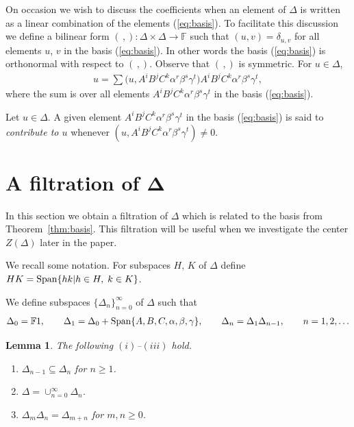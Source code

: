 \documentclass[pdftex]{sigma}
\numberwithin{equation}{section}
\newtheorem{Lemma}[Theorem]{Lemma}
\begin{document}
 On occasion we
wish to discuss the coef\/f\/icients
when an element of $\Delta$ is written as a linear
combination of the elements
(\ref{eq:basis}). To facilitate this discussion
we def\/ine a bilinear form
$(\,,) : \Delta \times \Delta \to \mathbb F$
such that $( u,v) = \delta_{u,v}$
for all elements $u$, $v$ in the basis
(\ref{eq:basis}). In other words
the basis
(\ref{eq:basis}) is
orthonormal with respect to
$( \,,) $.
 Observe that
$(\,,)$ is symmetric.
For $u \in \Delta$,
\begin{gather}
u = \sum \big(u, A^iB^jC^k\alpha^r\beta^s\gamma^t \big)
 A^iB^jC^k\alpha^r\beta^s\gamma^t,
\label{eq:bilsum}
\end{gather}
where the sum is over all elements
 $A^iB^jC^k\alpha^r\beta^s\gamma^t$ in the basis
(\ref{eq:basis}).

\begin{Definition}
\label{def:contrib}
\rm
Let $u \in \Delta $. A given element
 $A^iB^jC^k\alpha^r\beta^s\gamma^t$ in the basis
(\ref{eq:basis}) is said to
{\it contribute to
  $u$} whenever $(u,
 A^iB^jC^k\alpha^r\beta^s\gamma^t )
  \not=0$.
\end{Definition}







\section[A filtration of $\Delta$]{A f\/iltration of $\boldsymbol{\Delta}$}


In this section we obtain
a f\/iltration of $\Delta $
which
is related to the basis from Theorem~\ref{thm:basis}.
 This f\/iltration will be useful
when we investigate the center  $Z(\Delta)$ later in the paper.


We recall some notation.
For subspaces $H$, $K$ of $\Delta $ def\/ine
$HK={\rm Span}\lbrace hk | h \in H, \; k \in K\rbrace$.

\begin{Definition}
\label{def:ui}
We def\/ine subspaces
$\lbrace \Delta_n\rbrace_{n=0}^\infty$
of $\Delta $ such that
\begin{gather*}
\Delta_0=\mathbb F 1,
  \qquad
\Delta_1 =\Delta_0+{\rm Span}\lbrace A,B,C,\alpha,\beta,\gamma\rbrace,
 \qquad
\Delta_n=\Delta_1 \Delta_{n-1}, \qquad n=1,2,\ldots
\end{gather*}
\end{Definition}

\begin{Lemma}
\label{lem:filt}
The following $(i)$--$(iii)$ hold.
\begin{enumerate}\itemsep=0pt
\item[$(i)$]
 $\Delta_{n-1}\subseteq \Delta_n$ for  $n\geq 1$.
\item[$(ii)$]
$\Delta=\cup_{n=0}^\infty \Delta_n$.
\item[$(iii)$]
$\Delta_m \Delta_n = \Delta_{m+n} $ for
 $m,n\geq 0$.
\end{enumerate}
\end{Lemma}
\end{document}
